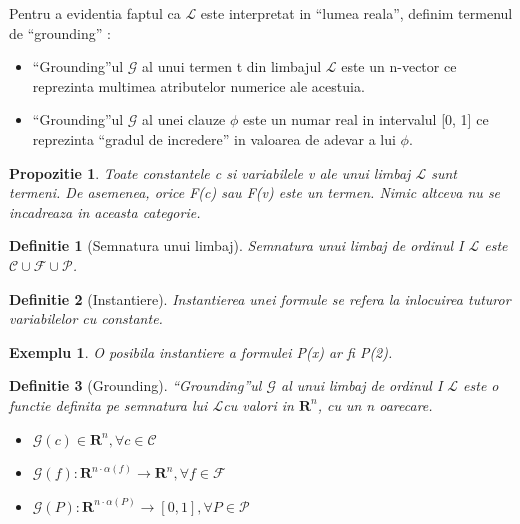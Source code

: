\documentclass{article}
\newtheorem{definition}{Definitie}[section]
\newtheorem{prop}{Propozitie}[section]
\newtheorem{example}{Exemplu}[section]
\begin{document}
Pentru a evidentia faptul ca $\mathcal{L}$ este interpretat in ``lumea reala'', definim termenul de ``grounding'' \cite{LTN}:\\
\begin{itemize}
	\item ``Grounding''ul $\mathcal{G}$ al unui termen t din limbajul $\mathcal{L}$ este un n-vector ce reprezinta multimea atributelor numerice ale acestuia.\\
	\item ``Grounding''ul $\mathcal{G}$ al unei clauze $\phi$ este un numar real in intervalul [0, 1] ce reprezinta ``gradul de incredere'' in valoarea de adevar a lui $\phi$.\\
\end{itemize}

\begin{prop}
Toate constantele c si variabilele v ale unui limbaj $\mathcal{L}$ sunt termeni. De asemenea, orice F(c) sau F(v) este un termen. Nimic altceva nu se incadreaza in aceasta categorie. \cite{FOL}
\end{prop}

\begin{definition}[Semnatura unui limbaj]
Semnatura unui limbaj de ordinul I $\mathcal{L}$ este $\mathcal{C} \cup \mathcal{F} \cup \mathcal{P}$. \cite{FOL}
\end{definition}

\begin{definition}[Instantiere]
Instantierea unei formule se refera la inlocuirea tuturor variabilelor cu constante. \cite{LTN}
\end{definition}

\begin{example}
O posibila instantiere a formulei P(x) ar fi P(2).
\end{example}

\begin{definition}[Grounding]
``Grounding''ul $\mathcal{G}$ al unui limbaj de ordinul I $\mathcal{L}$ este o functie definita pe semnatura lui $\mathcal{L}$cu valori in $\mathbf{R}^n$, cu un n oarecare. \cite{LTN}
\begin{itemize}
	\item $\mathcal{G}(c) \in \mathbf{R}^n, \forall c \in \mathcal{C}$
	\item $\mathcal{G}(f): \mathbf{R}^{n \cdot \alpha (f)} \rightarrow \mathbf{R}^n, \forall f \in \mathcal{F}$
	\item $\mathcal{G}(P): \mathbf{R}^{n \cdot \alpha (P)} \rightarrow [0, 1], \forall P \in \mathcal{P}$
\end{itemize}
\end{definition}
\end{document}
